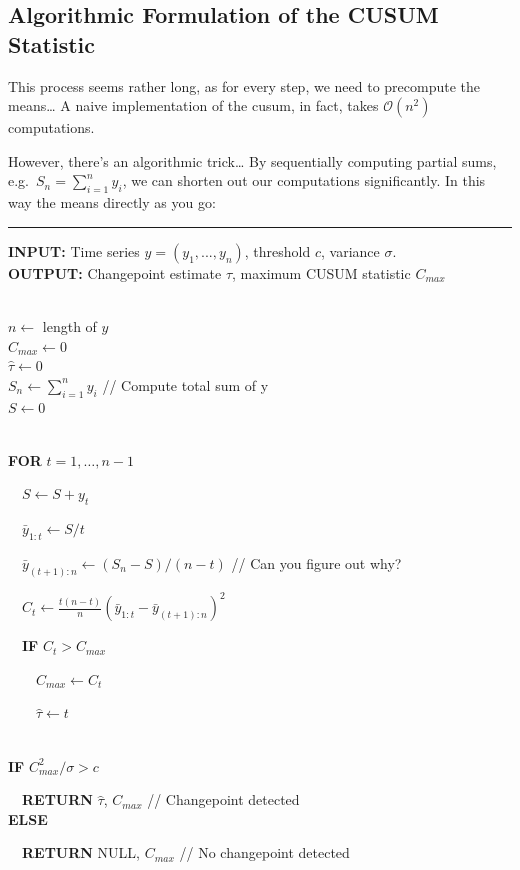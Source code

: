 \documentclass[
  letterpaper,
  DIV=11,
  numbers=noendperiod]{scrreprt}
\begin{document}
\subsection{Algorithmic Formulation of the CUSUM
Statistic}\label{algorithmic-formulation-of-the-cusum-statistic}

This process seems rather long, as for every step, we need to precompute
the means\ldots{} A naive implementation of the cusum, in fact, takes
\(\mathcal{O}(n^2)\) computations.

However, there's an algorithmic trick\ldots{} By sequentially computing
partial sums, e.g.~\(S_n = \sum_{i=1}^n y_i\), we can shorten out our
computations significantly. In this way the means directly as you go:

\begin{center}\rule{0.5\linewidth}{0.5pt}\end{center}

\textbf{INPUT:} Time series \(y = (y_1, ..., y_n)\), threshold \(c\),
variance \(\sigma\).\\
\textbf{OUTPUT:} Changepoint estimate \(\hat{\tau}\), maximum CUSUM
statistic \(C_{max}\)\\
\strut \\
\(n \leftarrow\) length of \(y\)\\
\(C_{max} \leftarrow 0\)\\
\(\hat{\tau} \leftarrow 0\)\\
\(S_n \leftarrow \sum_{i=1}^n y_i\) // Compute total sum of y\\
\(S \leftarrow 0\)\\
\strut \\
\textbf{FOR} \(t = 1, \dots, n - 1\)\\
\strut ~~\(S \leftarrow S + y_t\)\\
\strut ~~\(\bar{y}_{1:t} \leftarrow S / t\)\\
\strut ~~\(\bar{y}_{(t+1):n} \leftarrow (S_n - S) / (n - t)\) // Can you
figure out why?\\
\strut ~~\(C_t \leftarrow \frac{t(n-t)}{n} (\bar{y}_{1:t} - \bar{y}_{(t+1):n})^2\)\\
\strut ~~\textbf{IF} \(C_t > C_{max}\)\\
\strut ~~~~\(C_{max} \leftarrow C_t\)\\
\strut ~~~~\(\hat{\tau} \leftarrow t\)\\
\strut \\
\textbf{IF} \(C_{max}^2 / \sigma > c\)\\
\strut ~~\textbf{RETURN} \(\hat{\tau}\), \(C_{max}\) // Changepoint
detected\\
\textbf{ELSE}\\
\strut ~~\textbf{RETURN} NULL, \(C_{max}\) // No changepoint detected
\end{document}
